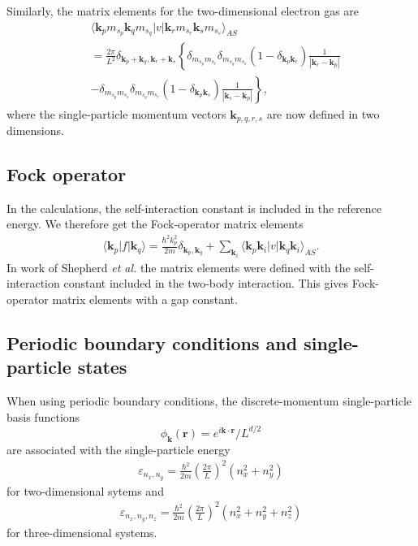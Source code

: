 \documentclass[%
oneside,                 %
final,                   %
10pt]{article}
\begin{document}
Similarly, the matrix elements for the two-dimensional
electron gas are
\begin{align} \label{eq:vmat_2dheg}
  & \langle \mathbf{k}_{p}m_{s_{p}}\mathbf{k}_{q}m_{s_{q}}
  |v|\mathbf{k}_{r}m_{s_{r}}\mathbf{k}_{s}m_{s_{s}}\rangle_{AS} 
  \nonumber \\
  & = \frac{2\pi }{L^{2}}
  \delta_{\mathbf{k}_{p}+\mathbf{k}_{q},\mathbf{k}_{r}+\mathbf{k}_{s}}
  \left\{ \delta_{m_{s_{p}}m_{s_{r}}}\delta_{m_{s_{q}}m_{s_{s}}} 
  \left( 1 - \delta_{\mathbf{k}_{p}\mathbf{k}_{r}}\right)
  \frac{1}{
    |\mathbf{k}_{r}-\mathbf{k}_{p}|} \right.
  \nonumber \\
  & - \left. \delta_{m_{s_{p}}m_{s_{s}}}\delta_{m_{s_{q}}m_{s_{r}}}
  \left( 1 - \delta_{\mathbf{k}_{p}\mathbf{k}_{s}}\right)
  \frac{1}{ 
    |\mathbf{k}_{s}-\mathbf{k}_{p}|}
  \right\} ,
\end{align}
where the single-particle momentum vectors $\mathbf{k}_{p,q,r,s}$
are now defined in two dimensions.



\subsection*{Fock operator}

In the calculations, the 
self-interaction constant is included in the reference 
energy. We therefore get the 
Fock-operator matrix elements 
\begin{align}
  \langle \mathbf{k}_{p}|f|\mathbf{k}_{q} \rangle
  = \frac{\hbar^{2}k_{p}^{2}}{2m}\delta_{\mathbf{k}_{p},
  \mathbf{k}_{q}} + \sum_{\mathbf{k}_{i}}\langle 
  \mathbf{k}_{p}\mathbf{k}_{i}|v|\mathbf{k}_{q}
  \mathbf{k}_{i}\rangle_{AS}.
  \label{eq:fock_heg}
\end{align}
In work of Shepherd \emph{et al.} the matrix elements were 
defined with the self-interaction constant included in the
two-body interaction. This gives Fock-operator matrix 
elements with a gap constant.



\subsection*{Periodic boundary conditions and single-particle states}

When using periodic boundary conditions, the 
discrete-momentum single-particle basis functions 
\[
\phi_{\mathbf{k}}(\mathbf{r}) =
e^{i\mathbf{k}\cdot \mathbf{r}}/L^{d/2}
\]
are associated with 
the single-particle energy   
\begin{align}
  \varepsilon_{n_{x}, n_{y}} = \frac{\hbar^{2}}{2m} \left( \frac{2\pi }{L}\right)^{2}\left( n_{x}^{2} + n_{y}^{2}\right)
\end{align}
for two-dimensional sytems and 
\begin{align}
  \varepsilon_{n_{x}, n_{y}, n_{z}} = \frac{\hbar^{2}}{2m}
  \left( \frac{2\pi }{L}\right)^{2}
  \left( n_{x}^{2} + n_{y}^{2} + n_{z}^{2}\right)
\end{align} 
for three-dimensional systems.
\end{document}

